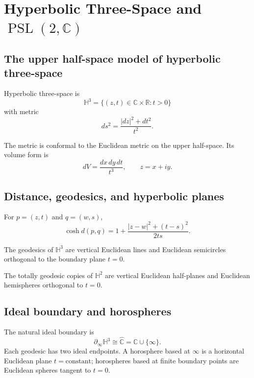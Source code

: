 \chapter{Hyperbolic Three-Space and $\operatorname{PSL}(2,\mathbb C)$}
\label{ch:vii36-h3-psl2c}

\section{The upper half-space model of hyperbolic three-space}

\begin{definition}\label{def:vii36-upper}
Hyperbolic three-space is
\[
\mathbb H^3=\{(z,t)\in\mathbb C\times\mathbb R:t>0\}
\]
with metric
\[
ds^2=\frac{|dz|^2+dt^2}{t^2}.
\]
\end{definition}

The metric is conformal to the Euclidean metric on the upper half-space.  Its volume form is
\[
dV=\frac{dx\,dy\,dt}{t^3},\qquad z=x+iy.
\]


\section{Distance, geodesics, and hyperbolic planes}

\begin{theorem}\label{thm:vii36-distance}
For \(p=(z,t)\) and \(q=(w,s)\),
\[
\cosh d(p,q)=1+\frac{|z-w|^2+(t-s)^2}{2ts}.
\]
\end{theorem}

\begin{theorem}[Geodesics]\label{thm:vii36-geodesics}
The geodesics of \(\mathbb H^3\) are vertical Euclidean lines and Euclidean semicircles orthogonal to the boundary plane \(t=0\).
\end{theorem}

\begin{proposition}\label{prop:vii36-planes}
The totally geodesic copies of \(\mathbb H^2\) are vertical Euclidean half-planes and Euclidean hemispheres orthogonal to \(t=0\).
\end{proposition}


\section{Ideal boundary and horospheres}

The natural ideal boundary is
\[
\partial_\infty\mathbb H^3\cong\widehat{\mathbb C}=\mathbb C\cup\{\infty\}.
\]
Each geodesic has two ideal endpoints.  A horosphere based at \(\infty\) is a horizontal Euclidean plane \(t=\text{constant}\); horospheres based at finite boundary points are Euclidean spheres tangent to \(t=0\).

